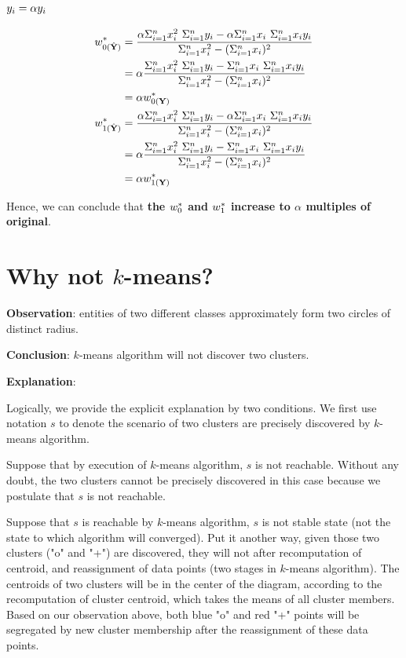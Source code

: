 \documentclass[11pt,a4paper]{article}
\begin{document}
\subsection{$y_i = \alpha y_i$}
\begin{align}
    w_{0(\Yhat)}^* &= \frac{\alpha \sxis \ \sy - \alpha \sxi \ \sxy}{ \sxis -
        (\sxi)^2} \\
    &= \alpha \frac{ \sxis \ \sy - \sxi \ \sxy}{\sxis - (\sxi)^2} \\
        &= \alpha w_{0(\Y)}^* \\
    w_{1(\Yhat)}^* &= \frac{\alpha \sxis \ \sy - \alpha \sxi \ \sxy}{ \sxis -
        (\sxi)^2} \\
    &= \alpha \frac{ \sxis \ \sy - \sxi \ \sxy}{\sxis - (\sxi)^2} \\
        &= \alpha w_{1(\Y)}^* \\
\end{align}

Hence, we can conclude that {\bf the $w_0^*$ and $w_1^*$ increase to $\alpha$
    multiples of original}.

\newpage
\section{Why not $k$-means?}
\textbf{Observation}: entities of two different classes approximately
form two circles of distinct radius. 

\noindent
\textbf{Conclusion}: $k$-means algorithm will not discover two clusters.

\noindent
\textbf{Explanation}: 

Logically, we provide the explicit explanation by two conditions. We first
use notation $s$ to denote the scenario of two clusters are precisely
discovered by $k$-means algorithm.

Suppose that by execution of $k$-means algorithm, $s$ is not reachable.
Without any doubt, the two clusters cannot be precisely discovered in this
case because we postulate that $s$ is not reachable.

Suppose that $s$ is reachable by $k$-means algorithm, $s$ is not stable state
(not the state to which algorithm will converged).  Put it another
way, given those two clusters ("o" and "+") are discovered,
they will not after recomputation of centroid, and reassignment of data points
(two stages in $k$-means algorithm). The centroids of two clusters will be in
the center of the diagram, according to the recomputation of cluster
centroid, which takes the means of all cluster members. Based on our
observation above, both blue "o" and red "+" points will be segregated by new
cluster membership after the reassignment of these data points.
\end{document}
